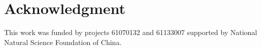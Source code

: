 \documentclass[conference,compsocconf]{IEEEtran}
\begin{document}


%






\section*{Acknowledgment}
This work was funded by projects 61070132 and 61133007 supported by National Natural Science Foundation of China.







\end{document}
